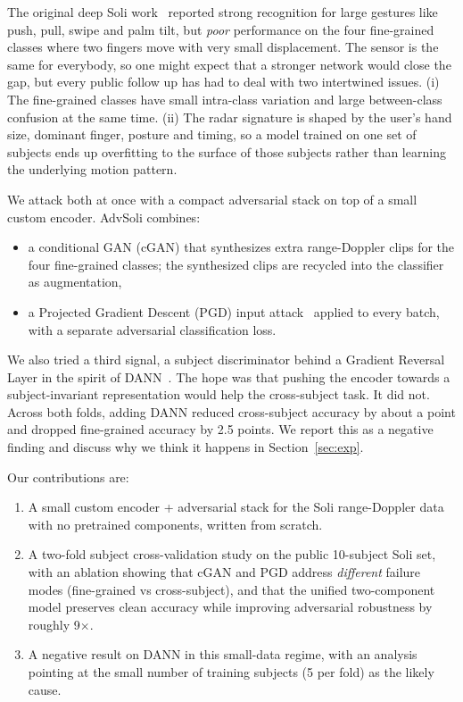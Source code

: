 \documentclass[10pt,twocolumn,letterpaper]{article}
\begin{document}
The original deep Soli work~\cite{wang2016interacting} reported strong
recognition for large gestures like push, pull, swipe and palm tilt, but
\emph{poor} performance on the four fine-grained classes where two
fingers move with very small displacement. The sensor is the same for
everybody, so one might expect that a stronger network would close the
gap, but every public follow up has had to deal with two intertwined
issues. (i) The fine-grained classes have small intra-class variation
and large between-class confusion at the same time. (ii) The radar
signature is shaped by the user's hand size, dominant finger, posture
and timing, so a model trained on one set of subjects ends up overfitting
to the surface of those subjects rather than learning the underlying
motion pattern.

We attack both at once with a compact adversarial stack on top of a small
custom encoder. AdvSoli combines:
\begin{itemize}
\setlength\itemsep{1pt}
\item a conditional GAN (cGAN) that synthesizes extra range-Doppler
clips for the four fine-grained classes; the synthesized clips are
recycled into the classifier as augmentation,
\item a Projected Gradient Descent (PGD) input attack~\cite{madry2018towards}
applied to every batch, with a separate adversarial classification loss.
\end{itemize}

We also tried a third signal, a subject discriminator behind a Gradient
Reversal Layer in the spirit of DANN~\cite{ganin2015dann}. The hope was
that pushing the encoder towards a subject-invariant representation
would help the cross-subject task. It did not. Across both folds, adding
DANN reduced cross-subject accuracy by about a point and dropped
fine-grained accuracy by 2.5 points. We report this as a negative
finding and discuss why we think it happens in
Section~\ref{sec:exp}.

Our contributions are:
\begin{enumerate}
\setlength\itemsep{1pt}
\item A small custom encoder + adversarial stack for the Soli
range-Doppler data with no pretrained components, written from scratch.
\item A two-fold subject cross-validation study on the public
10-subject Soli set, with an ablation showing that cGAN and PGD
address \emph{different} failure modes (fine-grained vs cross-subject),
and that the unified two-component model preserves clean accuracy while
improving adversarial robustness by roughly 9$\times$.
\item A negative result on DANN in this small-data regime, with an
analysis pointing at the small number of training subjects (5 per fold)
as the likely cause.
\end{enumerate}
\end{document}
